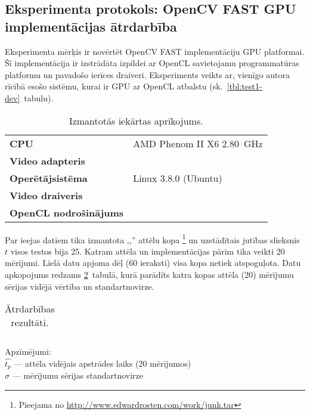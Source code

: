 \subsection{Eksperimenta protokols: OpenCV FAST GPU implementācijas ātrdarbība}\label{appx:test2}
\setcounter{table}{0} %
\setcounter{figure}{0} %
Eksperimenta mērķis ir novērtēt OpenCV FAST implementāciju GPU platformai.
Šī implementācija ir izstrādāta izpildei ar OpenCL savietojamu 
programmatūras platformu un pavadošo ierīces draiveri. Eksperiments veikts
ar, vienīgo autora rīcībā esošo sistēmu, kurai ir GPU ar OpenCL atbalstu
(sk.~\ref{tbl:test1-dev}~tabulu).
\begin{table}[hb]\small
	\centering
	\caption{Izmantotās iekārtas aprīkojums.}
	\label{tbl:test2-dev}
	\vspace{4pt}
	\begin{tabular}{ll}
		\toprule
		\textbf{CPU} & AMD Phenom II X6 2.80~GHz\\
		\textbf{Video adapteris} & \TODO \\
		\midrule
		\textbf{Operētājsistēma} & Linux 3.8.0 (Ubuntu) \\
		\textbf{Video draiveris} & \TODO \\
		\textbf{OpenCL nodrošinājums} & \TODO \\
		\bottomrule
	\end{tabular}
\end{table}

Par ieejas datiem tika izmantota ,,'' attēlu kopa%
	\footnote{Pieejama no \url{http://www.edwardrosten.com/work/junk.tar}}
un uzstādītais jutības slieksnis $t$ visos testos bija 25.
Katram attēla un implementācijas pārim tika veikti 20 mērījumi.
Lielā datu apjoma dēļ (60 ieraksti) visa kopa netiek atspoguļota. Datu
apkopojums redzams \ref{tbl:test2-data}~tabulā, kurā parādīts katra kopas
attēla (20) mērījumu sērijas vidējā vērtība un standartnovirze.

\begin{table}[hb]\footnotesize
	\centering
	\caption{Ātrdarbības rezultāti.}
	\label{tbl:test2-data}
	\vspace{4pt}
	\begin{tabular}{c*{6}{r}}
		\toprule
		
		\bottomrule
	\end{tabular}
	\begin{minipage}{0.5\linewidth}
		\noindent Apzīmējumi:\\
		$\hat{t_p}$ --- attēla vidējais apstrādes laiks (20 mērījumos)\\
		$\sigma$ --- mērījumu sērijas standartnovirze
	\end{minipage}
\end{table}

